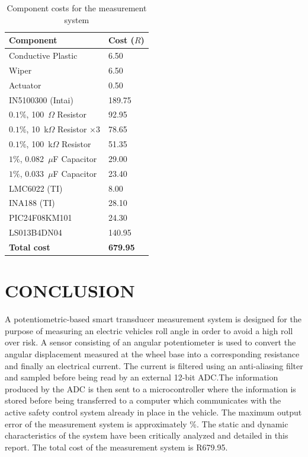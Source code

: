 \documentclass[10pt,twocolumn]{witseiepaper}
\begin{document}
\begin{table}[h!]
	\caption{Component costs for the measurement system} \label{tab:cost}
	\begin{tabular}{|p{}| p{}|}
		\hline
		\textbf{Component } & \textbf{Cost ($R$)} \\ \hline
		Conductive Plastic & 6.50 \\
		Wiper &  6.50 \\
		Actuator & 0.50 \\
		IN5100300 (Intai) & 189.75 \\
		$0.1\%$, 100~$\Omega$ Resistor& 92.95 \\
		$0.1\%$, 10~k$\Omega$ Resistor $\times 3$ & 78.65  \\
		$0.1\%$, 100~k$\Omega$ Resistor & 51.35\\
		$1\%$, 0.082~$\mu$F Capacitor &  29.00 \\
		$1\%$, 0.033~$\mu$F Capacitor &  23.40\\
		LMC6022 (TI) & 8.00 \\
		INA188 (TI)&  28.10 \\
		PIC24F08KM101 & 24.30 \\
		LS013B4DN04 & 140.95 \\ \hline
		\textbf{Total cost} &  \textbf{679.95} \\ \hline
	\end{tabular}
\end{table}

\section{CONCLUSION}

A  potentiometric-based smart transducer measurement system is designed for the purpose of measuring an electric vehicles roll angle in order to avoid a high roll over risk. A sensor consisting of an angular potentiometer is used to convert the angular displacement measured at the wheel base into a corresponding resistance and finally an electrical current. The current is filtered using an anti-aliasing filter and sampled before being read by an external 12-bit ADC.The information produced by the ADC is then sent to a microcontroller where the information is stored before being transferred to a computer which communicates with the active safety control system already in place in the vehicle. The maximum output error of the measurement system is approximately \%. The static and dynamic characteristics of the system have been critically analyzed and detailed in this report. The total cost of the measurement system is R679.95.
\end{document}

